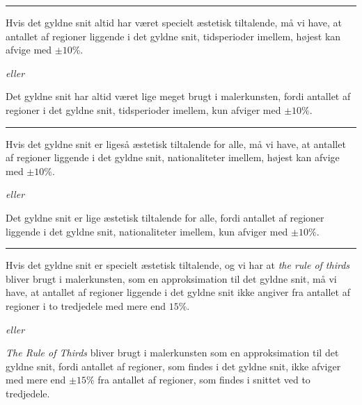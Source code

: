 {\hrule

\begin{hypotese}
    Hvis det gyldne snit altid har været specielt æstetisk tiltalende,
    må vi have, at antallet af regioner liggende i det gyldne snit,
    tidsperioder imellem, højest kan afvige med $\pm10\%$.
\end{hypotese}

\emph{eller}

\begin{hypotese}
    Det gyldne snit har altid været lige meget brugt i malerkunsten, fordi
    antallet af regioner i det gyldne snit, tidsperioder imellem, kun
    afviger med $\pm10\%$.
\end{hypotese}

\hrule

\begin{hypotese}
    Hvis det gyldne snit er ligeså  æstetisk tiltalende for alle,
    må vi have, at antallet af regioner liggende i det gyldne snit,
    nationaliteter imellem, højest kan afvige med $\pm10\%$.
\end{hypotese}

\emph{eller}

\begin{hypotese}
    Det gyldne snit er lige æstetisk tiltalende for alle, fordi antallet
    af regioner liggende i det gyldne snit, nationaliteter imellem, kun
    afviger med $\pm10\%$.
\end{hypotese}

\hrule

\begin{hypotese}
    Hvis det gyldne snit er specielt æstetisk tiltalende, og vi har at
    \emph{the rule of thirds} bliver brugt i malerkunsten, som en
    approksimation til det gyldne snit, må vi have, at antallet af
    regioner liggende i det gyldne snit ikke angiver fra antallet af
    regioner i to tredjedele med mere end $15\%$.
\end{hypotese}

\emph{eller}

\begin{hypotese}
    \emph{The Rule of Thirds} bliver brugt i malerkunsten som en
    approksimation til det gyldne snit, fordi antallet af regioner, som
    findes i det gyldne snit, ikke afviger med mere end $\pm15\%$ fra
    antallet af regioner, som findes i snittet ved to tredjedele.
\end{hypotese}

}
